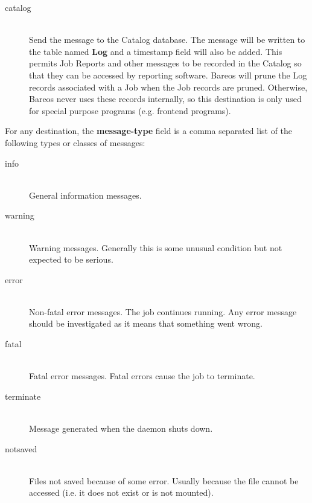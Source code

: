 \begin{description}
\begin{description}
\item [catalog] \hfill \\
Send the message to the Catalog database. The message will be
written to the table named {\bf Log} and a timestamp field will
also be added. This permits Job Reports and other messages to
be recorded in the Catalog so that they can be accessed by
reporting software.  Bareos will prune the Log records associated
with a Job when the Job records are pruned.  Otherwise, Bareos
never uses these records internally, so this destination is only
used for special purpose programs (e.g. frontend programs).

\end{description}

For any destination, the {\bf message-type} field is a comma separated
list of the following types or classes of messages:
\label{MessageTypes}

\begin{description}

\item [info] \hfill \\
General information messages.

\item [warning] \hfill \\
Warning messages. Generally this is some  unusual condition but not expected
to be serious.

\item [error] \hfill \\
Non-fatal error messages. The job continues running.  Any error message should
be investigated as it means that something  went wrong.

\item [fatal] \hfill \\
Fatal error messages. Fatal errors cause the  job to terminate.

\item [terminate] \hfill \\
Message generated when the daemon shuts down.

\item [notsaved] \hfill \\
Files not saved because of some error.  Usually because the file cannot be
accessed (i.e. it does not  exist or is not mounted).


\end{description}
\end{description}
